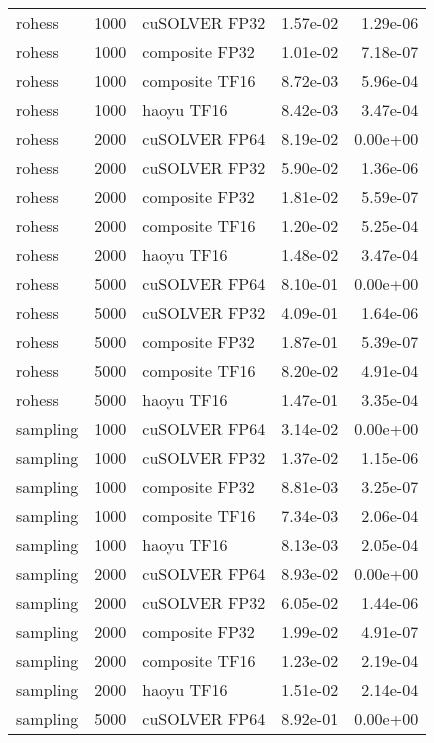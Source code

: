 \begin{table}
\begin{tabular}{lrlrr}
   rohess &  1000 &  cuSOLVER FP32 &  1.57e-02 &        1.29e-06 \\
   rohess &  1000 & composite FP32 &  1.01e-02 &        7.18e-07 \\
   rohess &  1000 & composite TF16 &  8.72e-03 &        5.96e-04 \\
   rohess &  1000 &     haoyu TF16 &  8.42e-03 &        3.47e-04 \\
   rohess &  2000 &  cuSOLVER FP64 &  8.19e-02 &        0.00e+00 \\
   rohess &  2000 &  cuSOLVER FP32 &  5.90e-02 &        1.36e-06 \\
   rohess &  2000 & composite FP32 &  1.81e-02 &        5.59e-07 \\
   rohess &  2000 & composite TF16 &  1.20e-02 &        5.25e-04 \\
   rohess &  2000 &     haoyu TF16 &  1.48e-02 &        3.47e-04 \\
   rohess &  5000 &  cuSOLVER FP64 &  8.10e-01 &        0.00e+00 \\
   rohess &  5000 &  cuSOLVER FP32 &  4.09e-01 &        1.64e-06 \\
   rohess &  5000 & composite FP32 &  1.87e-01 &        5.39e-07 \\
   rohess &  5000 & composite TF16 &  8.20e-02 &        4.91e-04 \\
   rohess &  5000 &     haoyu TF16 &  1.47e-01 &        3.35e-04 \\
 sampling &  1000 &  cuSOLVER FP64 &  3.14e-02 &        0.00e+00 \\
 sampling &  1000 &  cuSOLVER FP32 &  1.37e-02 &        1.15e-06 \\
 sampling &  1000 & composite FP32 &  8.81e-03 &        3.25e-07 \\
 sampling &  1000 & composite TF16 &  7.34e-03 &        2.06e-04 \\
 sampling &  1000 &     haoyu TF16 &  8.13e-03 &        2.05e-04 \\
 sampling &  2000 &  cuSOLVER FP64 &  8.93e-02 &        0.00e+00 \\
 sampling &  2000 &  cuSOLVER FP32 &  6.05e-02 &        1.44e-06 \\
 sampling &  2000 & composite FP32 &  1.99e-02 &        4.91e-07 \\
 sampling &  2000 & composite TF16 &  1.23e-02 &        2.19e-04 \\
 sampling &  2000 &     haoyu TF16 &  1.51e-02 &        2.14e-04 \\
 sampling &  5000 &  cuSOLVER FP64 &  8.92e-01 &        0.00e+00 \\

\end{tabular}
\end{table}
